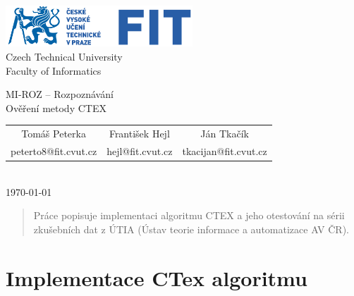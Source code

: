 \documentclass[fleqn,numbers=noenddot,headinclude,%
				11pt,a4paper,footinclude,%
				cleardoublepage=empty,abstractoff %
                ]{scrartcl}
\def\tomas{Tom\'{a}\v{s} Peterka}
\def\tomasid{peterto8}
\def\franta{Franti\v{s}ek Hejl}
\def\frantaid{hejl}
\def\jan{J\'{a}n Tka\v{c}\'{i}k}
\def\janid{tkacijan}
\def\frantaid{hejl}
\def\laboratoryname{Ov\v{e}\v{r}en\'{i} metody CTEX}
\def\date{\today}
\begin{document}
\pagestyle{empty}
\onecolumn
\null  %
\nointerlineskip  %
\vspace*{-1cm}
\begin{center}

\includegraphics[width=7cm,keepaspectratio=true]{./imgs/fit_logo.pdf}\\[0.3cm]
Czech Technical University\\
Faculty of Informatics

\vspace{1.2cm}

\Large MI-ROZ -- Rozpoznávání\\[0.5cm]
\laboratoryname \normalsize\\

\vspace{0.7cm}

\begin{tabular}{ccc}
\tomas & \franta & \jan \\
\tomasid @fit.cvut.cz & \frantaid @fit.cvut.cz & \janid @fit.cvut.cz \\
\end{tabular} \\[0.7cm]
\date
\end{center}
\vfill
\begin{abstract}
Práce popisuje implementaci algoritmu CTEX a jeho otestování na sérii zkušebních dat z ÚTIA (Ústav teorie informace a automatizace AV ČR).
\end{abstract}
\vfill
\tableofcontents

\clearpage

\pagestyle{scrheadings}
\setcounter{page}{1}

\section{Implementace CTex algoritmu}
\end{document}

